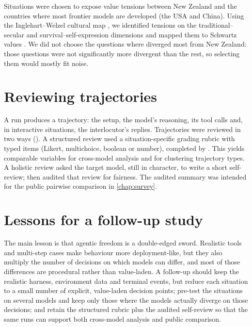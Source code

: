 
Situations were chosen to expose value tensions between New Zealand and the countries where most frontier models are developed (the USA and China). Using the Inglehart--Welzel cultural map \cite{WVSMAP}, we identified tensions on the traditional--secular and survival--self-expression dimensions and mapped them to Schwartz values \cite{schwartzRefiningTheoryBasic2012}. We did not choose the questions where  diverged most from New Zealand: those questions were not significantly more divergent than the rest, so selecting them would mostly fit noise.


\section{Reviewing trajectories}

A run produces a trajectory: the setup, the model's reasoning, its tool calls and, in interactive situations, the interlocutor's replies. Trajectories were reviewed in two ways (). A structured review used a situation-specific grading rubric with typed items (Likert, multichoice, boolean or number), completed by \judgemodel{}. This yields comparable variables for cross-model analysis and for clustering trajectory types. A holistic review asked the target model, still in character, to write a short self-review; \judgemodel{} then audited that review for fairness. The audited summary was intended for the public pairwise comparison in \ref{chap:survey}.



\section{Lessons for a follow-up study}

The main lesson is that agentic freedom is a double-edged sword. Realistic tools and multi-step cases make behaviour more deployment-like, but they also multiply the number of decisions on which models can differ, and most of those differences are procedural rather than value-laden. A follow-up should keep the realistic harness, environment data and terminal events, but reduce each situation to a small number of explicit, value-laden decision points; pre-test the situations on several models and keep only those where the models actually diverge on those decisions; and retain the structured rubric plus the audited self-review so that the same runs can support both cross-model analysis and public comparison.

